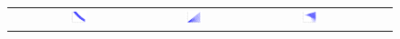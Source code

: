 \documentclass[letterpaper]{article}
\newcommand{\nn}{0.16}
\begin{document}
\begin{figure}
\begin{center}
\begin{tabular}{cccccc}
& \hspace{-3mm} \includegraphics[width=\nn\textwidth]{Figs/col_m1v1_when_p_is_3_and_v2_is_0_dot_2.png}
& \hspace{-3mm} \includegraphics[width=\nn\textwidth]{Figs/col_v1v2.png}
& \hspace{-3mm} \includegraphics[width=\nn\textwidth]{Figs/col_v1v2whenPis3.png}

\end{tabular}
\end{center}
\end{figure}
\end{document}
